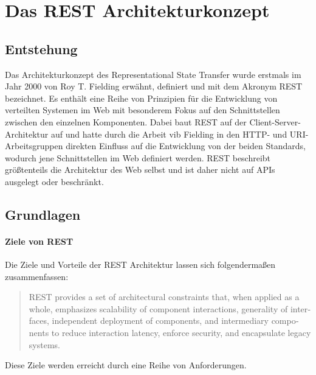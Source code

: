 \chapter{Das REST Architekturkonzept}
\section{Entstehung}
Das Architekturkonzept des Representational State Transfer wurde erstmals im Jahr 2000 von Roy T. Fielding erwähnt, definiert und mit dem Akronym REST bezeichnet.\cite[76]{REST}
Es enthält eine Reihe von Prinzipien für die Entwicklung von verteilten Systemen im Web mit besonderem Fokus auf den Schnittstellen zwischen den einzelnen Komponenten.
Dabei baut REST auf der Client-Server-Architektur auf und hatte durch die Arbeit vib Fielding in den HTTP- und URI-Arbeitsgruppen direkten Einfluss auf die Entwicklung von der beiden Standards, wodurch jene Schnittstellen im Web definiert werden.\cite[vgl.][4,105f.]{REST}
REST beschreibt größtenteils die Architektur des Web selbst und ist daher nicht auf APIs ausgelegt oder beschränkt.

\section{Grundlagen}
\subsubsection{Ziele von REST}
Die Ziele und Vorteile der REST Architektur lassen sich folgendermaßen zusammenfassen:
\foreignblockcquote{english}[105]{REST}{REST provides a set of architectural constraints that, when applied as a whole, emphasizes scalability of component interactions, generality of interfaces, independent deployment of components, and intermediary components to reduce interaction latency, enforce security, and encapsulate  legacy  systems.}
Diese Ziele werden erreicht durch eine Reihe von Anforderungen.
